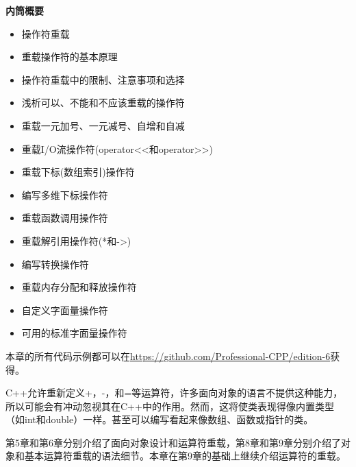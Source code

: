 \noindent
\textbf{内筒概要}

\begin{itemize}
\item
操作符重载

\item
重载操作符的基本原理

\item
操作符重载中的限制、注意事项和选择

\item
浅析可以、不能和不应该重载的操作符

\item
重载一元加号、一元减号、自增和自减

\item
重载I/O流操作符(operator<{}<和operator>{}>)

\item
重载下标(数组索引)操作符

\item
编写多维下标操作符

\item
重载函数调用操作符

\item
重载解引用操作符(*和->)

\item
编写转换操作符

\item
重载内存分配和释放操作符

\item
自定义字面量操作符

\item
可用的标准字面量操作符
\end{itemize}

本章的所有代码示例都可以在\url{https://github.com/Professional-CPP/edition-6}获得。

C++允许重新定义+，-，和=等运算符，许多面向对象的语言不提供这种能力，所以可能会有冲动忽视其在C++中的作用。然而，这将使类表现得像内置类型（如int和double）一样。甚至可以编写看起来像数组、函数或指针的类。

第5章和第6章分别介绍了面向对象设计和运算符重载，第8章和第9章分别介绍了对象和基本运算符重载的语法细节。本章在第9章的基础上继续介绍运算符的重载。












